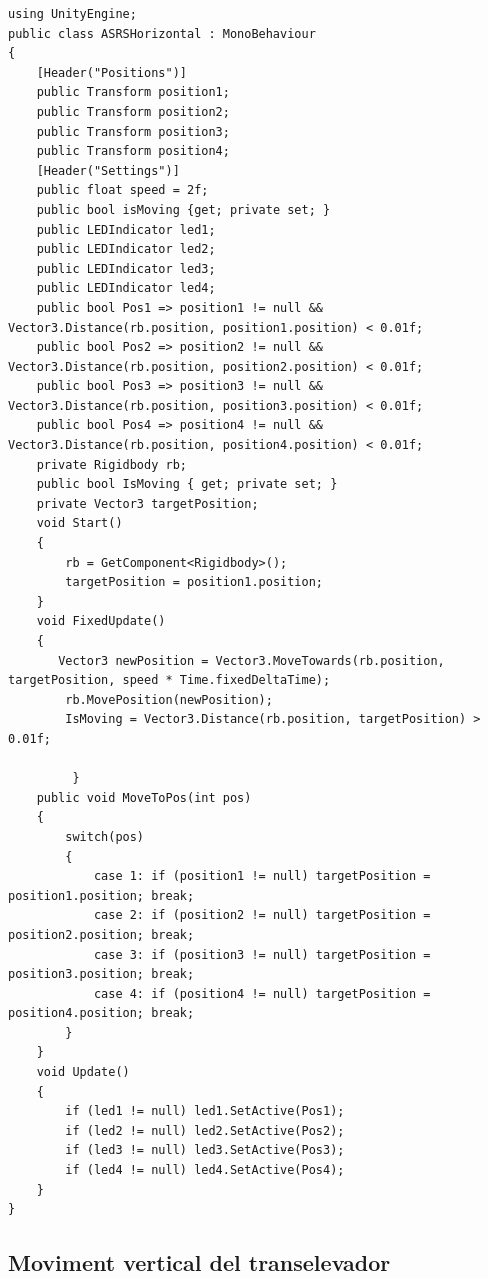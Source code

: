 \documentclass[a4paper,11pt,DIV=13,headings=normal,abstract=true,twoside=semi]{article}
\begin{document}
\begin{lstlisting}[style=modern, caption={Moviment horitzontal del transelevador}, label={lst:asrshorizontal}]
using UnityEngine;
public class ASRSHorizontal : MonoBehaviour
{
    [Header("Positions")]
    public Transform position1;
    public Transform position2;
    public Transform position3;
    public Transform position4;
    [Header("Settings")]
    public float speed = 2f;
    public bool isMoving {get; private set; }
    public LEDIndicator led1;
    public LEDIndicator led2;
    public LEDIndicator led3;
    public LEDIndicator led4;   
    public bool Pos1 => position1 != null && Vector3.Distance(rb.position, position1.position) < 0.01f;
    public bool Pos2 => position2 != null && Vector3.Distance(rb.position, position2.position) < 0.01f;
    public bool Pos3 => position3 != null && Vector3.Distance(rb.position, position3.position) < 0.01f;
    public bool Pos4 => position4 != null && Vector3.Distance(rb.position, position4.position) < 0.01f;  
    private Rigidbody rb;
    public bool IsMoving { get; private set; }
    private Vector3 targetPosition;
    void Start()
    {
        rb = GetComponent<Rigidbody>();
        targetPosition = position1.position;
    }
    void FixedUpdate()
    {
       Vector3 newPosition = Vector3.MoveTowards(rb.position, targetPosition, speed * Time.fixedDeltaTime);
        rb.MovePosition(newPosition);
        IsMoving = Vector3.Distance(rb.position, targetPosition) > 0.01f;

         }
    public void MoveToPos(int pos)
    {
        switch(pos)
        {
            case 1: if (position1 != null) targetPosition = position1.position; break;
            case 2: if (position2 != null) targetPosition = position2.position; break;
            case 3: if (position3 != null) targetPosition = position3.position; break;
            case 4: if (position4 != null) targetPosition = position4.position; break;
        }
    }
    void Update()
    {
        if (led1 != null) led1.SetActive(Pos1);
        if (led2 != null) led2.SetActive(Pos2);
        if (led3 != null) led3.SetActive(Pos3);
        if (led4 != null) led4.SetActive(Pos4);
    }
}
\end{lstlisting}

\subsection*{Moviment vertical del transelevador}
\end{document}
